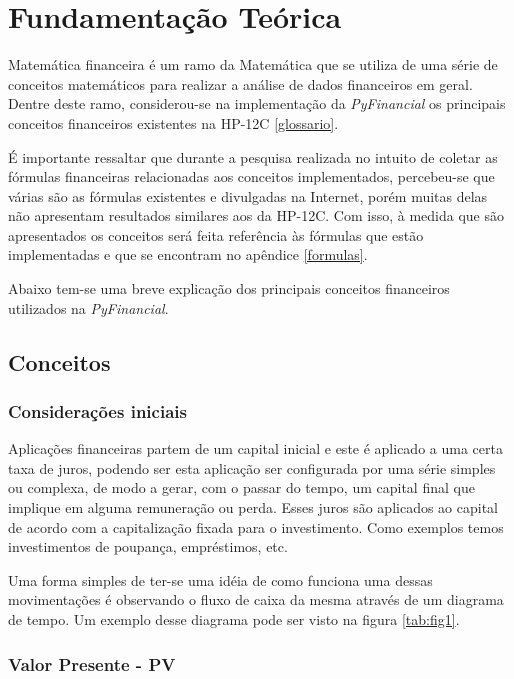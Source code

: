 \chapter{Fundamentação Teórica}

Matemática financeira é um ramo da Matemática que se utiliza de uma série de conceitos matemáticos para realizar a análise de dados financeiros em geral. Dentre deste ramo,  considerou-se na implementação da \textit{PyFinancial} os principais conceitos financeiros existentes na HP-12C \ref{glossario}.

É importante ressaltar que durante a pesquisa realizada no intuito de coletar as fórmulas financeiras relacionadas aos conceitos implementados, percebeu-se que várias são as fórmulas existentes e divulgadas na Internet, porém muitas delas não apresentam resultados similares aos da HP-12C. Com isso, à medida que são apresentados os conceitos será feita referência às fórmulas que estão implementadas e que se encontram no apêndice \ref{formulas}.

Abaixo tem-se uma breve explicação dos principais conceitos financeiros utilizados na \textit{PyFinancial}.

\section{Conceitos}

\subsection{Considerações iniciais}

Aplicações financeiras partem de um capital inicial e este é aplicado a uma certa taxa de juros, podendo ser esta aplicação ser configurada por uma série simples ou complexa, de modo a gerar, com o passar do tempo, um capital final que implique em alguma remuneração ou perda. Esses juros são aplicados ao capital de acordo com a capitalização fixada para o investimento. Como exemplos temos investimentos de poupança, empréstimos, etc.

Uma forma simples de ter-se uma idéia de como funciona uma dessas movimentações é observando o fluxo de caixa da mesma através de um diagrama de tempo. Um exemplo desse diagrama pode ser visto na figura \ref{tab:fig1}.

\subsection{Valor Presente - PV}

